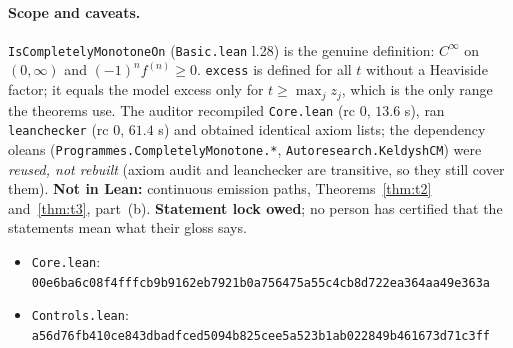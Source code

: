 \documentclass[10pt]{article}
\newcommand{\lean}[1]{\texttt{#1}}
\theoremstyle{plain}
\begin{document}
\paragraph{Scope and caveats.} \lean{IsCompletelyMonotoneOn} (\texttt{Basic.lean} l.28) is the genuine definition: $C^\infty$ on $(0,\infty)$ and $(-1)^nf^{(n)}\ge0$. \lean{excess} is defined for all $t$ without a Heaviside factor; it equals the model excess only for $t\ge\max_jz_j$, which is the only range the theorems use. The auditor recompiled \texttt{Core.lean} (rc $0$, $13.6$ s), ran \texttt{leanchecker} (rc $0$, $61.4$ s) and obtained identical axiom lists; the dependency oleans (\texttt{Programmes.CompletelyMonotone.*}, \texttt{Autoresearch.KeldyshCM}) were \emph{reused, not rebuilt} (axiom audit and leanchecker are transitive, so they still cover them). \textbf{Not in Lean:} continuous emission paths, Theorems~\ref{thm:t2} and~\ref{thm:t3}, part~(b). \textbf{Statement lock owed}; no person has certified that the statements mean what their gloss says.
\begin{itemize}\scriptsize\itemsep=0pt
\item \texttt{Core.lean}: \texttt{00e6ba6c08f4fffcb9b9162eb7921b0a756475a55c4cb8d722ea364aa49e363a}
\item \texttt{Controls.lean}: \texttt{a56d76fb410ce843dbadfced5094b825cee5a523b1ab022849b461673d71c3ff}
\end{itemize}

\end{document}
